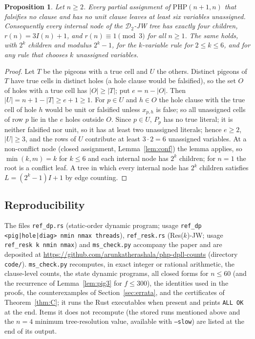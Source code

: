 \documentclass[11pt]{article}
\newtheorem{proposition}{Proposition}
\theoremstyle{definition}
\theoremstyle{remark}
\newcommand{\PHP}{\mathrm{PHP}}
\begin{document}
\begin{proposition}\label{prop:mod3}
Let $n\ge2$. Every partial assignment of $\PHP(n{+}1,n)$ that falsifies no clause and has no unit clause leaves at least six variables unassigned. Consequently every internal node of the $\mathcal D_2$-JW tree has exactly four children, $r(n)=3I(n)+1$, and $r(n)\equiv1\pmod 3$ for all $n\ge1$. The same holds, with $2^k$ children and modulus $2^k-1$, for the $k$-variable rule for $2\le k\le6$, and for any rule that chooses $k$ unassigned variables.
\end{proposition}
\begin{proof}
Let $T$ be the pigeons with a true cell and $U$ the others. Distinct pigeons of $T$ have true cells in distinct holes (a hole clause would be falsified), so the set $O$ of holes with a true cell has $|O|\ge|T|$; put $e=n-|O|$. Then $|U|=n+1-|T|\ge e+1\ge1$. For $p\in U$ and $h\in O$ the hole clause with the true cell of hole $h$ would be unit or falsified unless $x_{p,h}$ is false; so all unassigned cells of row $p$ lie in the $e$ holes outside $O$. Since $p\in U$, $P_p$ has no true literal; it is neither falsified nor unit, so it has at least two unassigned literals; hence $e\ge2$, $|U|\ge3$, and the rows of $U$ contribute at least $3\cdot2=6$ unassigned variables. At a non-conflict node (closed assignment, Lemma~\ref{lem:conf}) the lemma applies, so $\min(k,m)=k$ for $k\le6$ and each internal node has $2^k$ children; for $n=1$ the root is a conflict leaf. A tree in which every internal node has $2^k$ children satisfies $L=(2^k-1)I+1$ by edge counting.
\end{proof}

\subsection{Reproducibility}\label{sec:repro}
The files \texttt{ref\_dp.rs} (static-order dynamic program; usage
\texttt{ref\_dp <pig|hole|diag> nmin nmax threads}), \texttt{ref\_resk.rs} (Res($k$)-JW; usage
\texttt{ref\_resk k nmin nmax}) and \texttt{ms\_check.py} accompany the paper and are deposited at
\url{https://github.com/arunkatherashala/php-dpll-counts} (directory \texttt{code/}). \texttt{ms\_check.py} recomputes, in exact integer or rational arithmetic, the
clause-level counts, the state dynamic programs, all closed forms for $n\le60$ (and the recurrence of
Lemma~\ref{lem:pig3} for $f\le300$), the identities used in the proofs, the counterexamples of
Section~\ref{sec:errata}, and the certificates of Theorem~\ref{thm:C}; it runs the Rust executables when present
and prints \texttt{ALL OK} at the end. Items it does not recompute (the stored runs mentioned above and the
$n=4$ minimum tree-resolution value, available with \texttt{--slow}) are listed at the end of its output.
\end{document}
